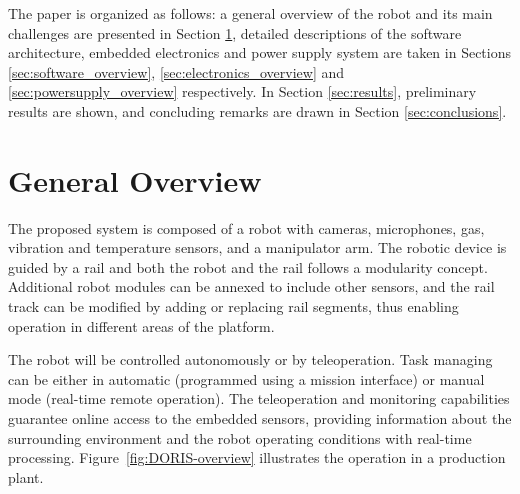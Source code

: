 \documentclass{ifacconf}
\begin{document}
The paper is organized as follows: a general overview of the robot and its main
challenges are presented in Section \ref{sec:general_overview}, detailed
descriptions of the software architecture, embedded electronics and power supply
system are taken in Sections \ref{sec:software_overview},
\ref{sec:electronics_overview} and \ref{sec:powersupply_overview} respectively.
In Section \ref{sec:results}, preliminary results are shown, and concluding
remarks are drawn in Section \ref{sec:conclusions}. 

% 

\section{General Overview}\label{sec:general_overview}

The proposed system is composed of a robot with cameras, microphones, gas,
vibration and temperature sensors, and a manipulator arm. The robotic device is
guided by a rail and both the robot and the rail follows a modularity concept.
Additional robot modules can be annexed to include other sensors, and the rail
track can be modified by adding or replacing rail segments, thus enabling
operation in different areas of the platform.%

The robot will be controlled autonomously or by teleoperation. Task managing
can be either in automatic (programmed using a mission interface) or manual
mode (real-time remote operation). The teleoperation and monitoring
capabilities guarantee online access to the embedded sensors, providing
information about the surrounding environment and the robot operating
conditions with real-time processing. Figure~\ref{fig:DORIS-overview}
illustrates the operation in a production plant.

\end{document}
